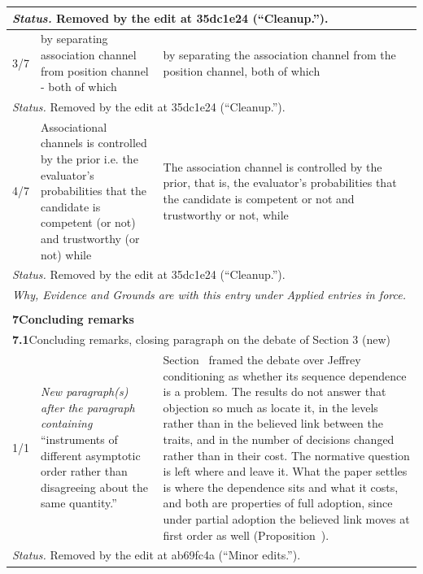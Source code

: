 \documentclass[10pt]{article}
\theoremstyle{definition}
\renewcommand{\ref}[1]{\textsc{\detokenize{#1}}}
\newlength{\fullw}\setlength{\fullw}{25.9cm}
\newcommand{\entryhead}[2]{\multicolumn{3}{|l|}{\rule{0pt}{2.6ex}\large\textbf{#1}\quad #2} \\ \hline}
\begin{document}
{\begin{longtable}{|p{0.9cm}|p{12.2cm}|p{12.2cm}|}
\multicolumn{3}{|p{\fullw}|}{\textit{Status.} Removed by the edit at 35dc1e24 (``Cleanup.'').} \\ \hline
3/7 & by separating association channel from position channel - both of which & by separating the association channel from the position channel, both of which \\ \hline
\multicolumn{3}{|p{\fullw}|}{\textit{Status.} Removed by the edit at 35dc1e24 (``Cleanup.'').} \\ \hline
4/7 & Associational channels is controlled by the prior i.e. the evaluator's probabilities that the candidate is competent (or not) and trustworthy (or not) while & The association channel is controlled by the prior, that is, the evaluator's probabilities that the candidate is competent or not and trustworthy or not, while \\ \hline
\multicolumn{3}{|p{\fullw}|}{\textit{Status.} Removed by the edit at 35dc1e24 (``Cleanup.'').} \\ \hline
\multicolumn{3}{|p{\fullw}|}{\textit{Why, Evidence and Grounds are with this entry under Applied entries in force.}} \\ \hline
\multicolumn{3}{|l|}{} \\ \hline
\multicolumn{3}{|l|}{\rule{0pt}{3.2ex}\Large\textbf{7\quad Concluding remarks}} \\ \hline\hline
\entryhead{7.1}{Concluding remarks, closing paragraph on the debate of Section 3 (new)\quad{\footnotesize\textit{(formerly C.17)}}}
1/1 & \textit{New paragraph(s) after the paragraph containing} ``instruments of different asymptotic order rather than disagreeing about the same quantity.'' & Section~\ref{sec:literature} framed the debate over Jeffrey conditioning as whether its sequence dependence is a problem. The results do not answer that objection so much as locate it, in the levels rather than in the believed link between the traits, and in the number of decisions changed rather than in their cost. The normative question is left where \citet{Doring1999} and \citet{Hawthorne2004} leave it. What the paper settles is where the dependence sits and what it costs, and both are properties of full adoption, since under partial adoption the believed link moves at first order as well (Proposition~\ref{prop:LAD}). \\ \hline
\multicolumn{3}{|p{\fullw}|}{\textit{Status.} Removed by the edit at ab69fc4a (``Minor edits.'').} \\ \hline

\end{longtable}}
\end{document}
